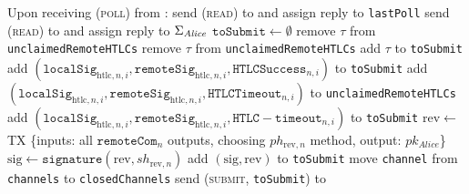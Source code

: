 \begin{algorithmic}[1]
    \State Upon receiving (\textsc{poll}) from \environment:
    \Indent
      \State send (\textsc{read}) to \clock{} and assign reply to
      \texttt{lastPoll}
      \State send (\textsc{read}) to \ledger{} and assign reply to
      $\Sigma_{\mathit{Alice}}$
      \State $\mathtt{toSubmit} \gets \emptyset$
         
          \State remove $\tau$ from \texttt{unclaimedRemoteHTLCs}
          \State remove $\tau$ from \texttt{unclaimedRemoteHTLCs}
          \State add $\tau$ to \texttt{toSubmit}
        \EndIf
      \EndFor
         
            \State add $\left(\mathtt{localSig}_{\mathrm{htlc}, n, i},
            \mathtt{remoteSig}_{\mathrm{htlc}, n, i}, \mathtt{HTLCSuccess}_{n,
            i}\right)$ to \texttt{toSubmit}
          \EndFor
              \State add $\left(\mathtt{localSig}_{\mathrm{htlc}, n, i},
              \mathtt{remoteSig}_{\mathrm{htlc}, n, i},
              \mathtt{HTLCTimeout}_{n, i}\right)$ to
              \texttt{unclaimedRemoteHTLCs}
              \State add $\left(\mathtt{localSig}_{\mathrm{htlc}, n, i},
              \mathtt{remoteSig}_{\mathrm{htlc}, n, i},
              \mathtt{HTLC-timeout}_{n, i}\right)$ to \texttt{toSubmit}
            \EndIf
          \EndFor
        \Else {}
          \State $\mathrm{rev} \gets$ TX \{inputs: all $\mathtt{remoteCom}_n$
          outputs, choosing $ph_{\mathrm{rev}, n}$ method, output:
          $pk_{\mathit{Alice}}$\} 
          \State $\mathrm{sig} \gets \mathtt{signature}\left(\mathrm{rev},
          sh_{\mathrm{rev}, n}\right)$
          \State add $\left(\mathrm{sig}, \mathrm{rev}\right)$ to
          \texttt{toSubmit}
        \EndIf
        \State move \texttt{channel} from \texttt{channels} to
        \texttt{closedChannels}
      \EndFor
      \State send (\textsc{submit}, \texttt{toSubmit}) to \ledger
    \EndIndent
    \State


\end{algorithmic}

